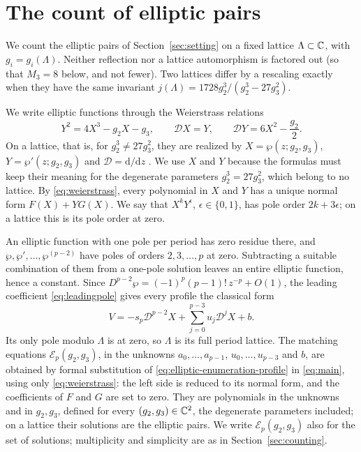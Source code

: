 \section{The count of elliptic pairs}\label{sec:elliptic-counting}

We count the elliptic pairs of Section~\ref{sec:setting} on a fixed
lattice \(\Lambda\subset\mathbb C\), with \(g_i=g_i(\Lambda)\). Neither
reflection nor a lattice automorphism is factored out (so that \(M_3=8\)
below, and not fewer). Two lattices differ by a rescaling exactly when
they have the same invariant \(j(\Lambda)=1728g_2^3/(g_2^3-27g_3^2)\).

We write elliptic functions through the Weierstrass relations
\begin{equation}\label{eq:weierstrass}
 Y^2=4X^3-g_2X-g_3,\qquad \mathscr D X=Y,\qquad
 \mathscr D Y=6X^2-\frac{g_2}{2}.
\end{equation}
On a lattice, that is, for \(g_2^3\ne27g_3^2\), they are realized by
\(X=\wp(z;g_2,g_3)\), \(Y=\wp'(z;g_2,g_3)\) and
\(\mathscr D=\mathrm d/\mathrm dz\) \citep[Chapter~23]{DLMF}. We use
\(X\) and \(Y\) because the formulas must keep their meaning for the
degenerate parameters \(g_2^3=27g_3^2\), which belong to no lattice.
By \eqref{eq:weierstrass}, every polynomial in \(X\) and \(Y\) has a
unique normal form \(F(X)+YG(X)\). We say that \(X^kY^\epsilon\),
\(\epsilon\in\{0,1\}\), has pole order \(2k+3\epsilon\); on a lattice
this is its pole order at zero.

An elliptic function with one pole per period has zero residue there,
and \(\wp,\wp',\ldots,\wp^{(p-2)}\) have poles of orders
\(2,3,\ldots,p\) at zero. Subtracting a suitable combination of them
from a one-pole solution leaves an entire elliptic function, hence a
constant. Since \(D^{p-2}\wp=(-1)^{p}(p-1)!\,z^{-p}+O(1)\), the leading
coefficient \eqref{eq:leadingpole} gives every profile the classical
form
\begin{equation}\label{eq:elliptic-enumeration-profile}
 V=-s_p\mathscr D^{p-2}X+\sum_{j=0}^{p-3}u_j\mathscr D^jX+b.
\end{equation}
Its only pole modulo \(\Lambda\) is at zero, so \(\Lambda\) is its full
period lattice. The matching equations \(\mathcal E_p(g_2,g_3)\), in the
unknowns \(a_0,\ldots,a_{p-1}\), \(u_0,\ldots,u_{p-3}\) and \(b\), are
obtained by formal substitution of
\eqref{eq:elliptic-enumeration-profile} in \eqref{eq:main}, using only
\eqref{eq:weierstrass}: the left side is reduced to its normal form, and
the coefficients of \(F\) and \(G\) are set to zero. They are
polynomials in the unknowns and in \(g_2,g_3\), defined for every
\((g_2,g_3)\in\mathbb C^2\), the degenerate parameters included; on a lattice
their solutions are the elliptic pairs. We write
\(\mathcal E_p(g_2,g_3)\) also for the set of solutions; multiplicity
and simplicity are as in Section~\ref{sec:counting}.

